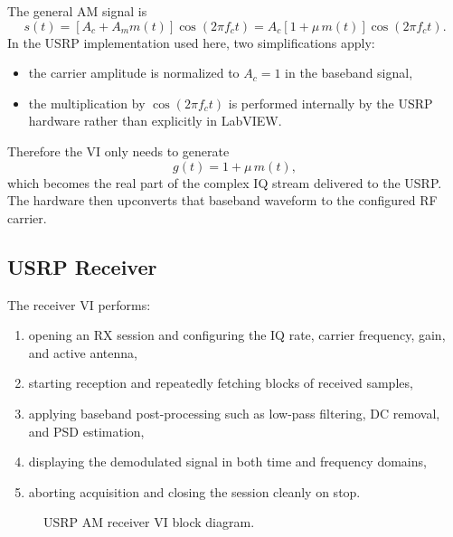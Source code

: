 \begin{tcolorbox}[breakable, colback=green!5!white,
colframe=green!60!black,
title={\textbf{Intuition: Baseband Signal Generation in the USRP Transmitter}}]
The general AM signal is
\begin{equation}
s(t)=\left[A_c + A_m m(t)\right]\cos(2\pi f_c t)
=A_c\left[1+\mu\,m(t)\right]\cos(2\pi f_c t).
\end{equation}
In the USRP implementation used here, two simplifications apply:
\begin{itemize}
\item the carrier amplitude is normalized to $A_c=1$ in the baseband signal,
\item the multiplication by $\cos(2\pi f_c t)$ is performed internally by the
USRP hardware rather than explicitly in LabVIEW.
\end{itemize}
Therefore the VI only needs to generate
\begin{equation}
g(t)=1+\mu\,m(t),
\end{equation}
which becomes the real part of the complex IQ stream delivered to the USRP. The
hardware then upconverts that baseband waveform to the configured RF carrier.
\end{tcolorbox}

\subsection{USRP Receiver}

The receiver VI performs:
\begin{enumerate}
\item opening an RX session and configuring the IQ rate, carrier frequency, gain,
and active antenna,
\item starting reception and repeatedly fetching blocks of received samples,
\item applying baseband post-processing such as low-pass filtering, DC removal,
and PSD estimation,
\item displaying the demodulated signal in both time and frequency domains,
\item aborting acquisition and closing the session cleanly on stop.
\end{enumerate}

\begin{figure}[H]
\centering
{}
\caption{USRP AM receiver VI block diagram.}
\label{fig:lab2_usrp_rx_vi}
\end{figure}

